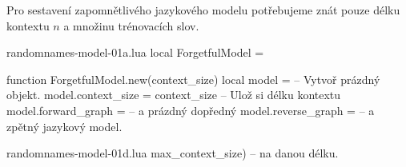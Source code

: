 \documentclass{csbulletin}
\begin{document}
Pro sestavení zapomnětlivého jazykového modelu potřebujeme znát pouze délku kontextu $n$ a množinu trénovacích slov.
\begin{filecontents}{randomnames-model-01a.lua}
local ForgetfulModel = {}

function ForgetfulModel.new(context_size)
  local model = {}                   -- Vytvoř prázdný objekt.
  model.context_size = context_size  -- Ulož si délku kontextu
  model.forward_graph = {}           -- a prázdný dopředný
  model.reverse_graph = {}           -- a zpětný jazykový model.
\end{filecontents}
\begin{filecontents}[overwrite, nosearch, noheader]{randomnames-model-01b.lua}
  local mt = {                       -- Zděď metody\footnotemark
\end{filecontents}
\begin{filecontents}[overwrite, nosearch, noheader]{randomnames-model-01c.lua}
    __index = ForgetfulModel }       -- třídy `ForgetfulModel`.
  setmetatable(model, mt)
  return model
end

local function trim_context(context,           -- Ořízni kontext
\end{filecontents}
\begin{filecontents}{randomnames-model-01d.lua}
                            max_context_size)  -- na danou délku.\footnotemark
\end{filecontents}
\end{document}
